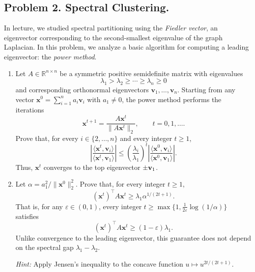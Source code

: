 \documentclass[12pt]{article}
\theoremstyle{plain}
\theoremstyle{definition}
\newcommand{\R}{\mathbb{R}}
\begin{document}
\subsection*{Problem 2. Spectral Clustering.}
In lecture, we studied spectral partitioning using the \emph{Fiedler vector}, an eigenvector corresponding to the second-smallest eigenvalue of the graph Laplacian. In this problem, we analyze a basic algorithm for computing a leading eigenvector: the \emph{power method}.
\begin{enumerate}
    \item Let $A\in\R^{n\times n}$ be a symmetric positive semidefinite matrix with eigenvalues
\[
    \lambda_1>\lambda_2\geq\cdots\geq\lambda_n\geq 0
\]
and corresponding orthonormal eigenvectors $\mathbf{v}_1,\dots,\mathbf{v}_n$. Starting from any vector $\mathbf{x}^0=\sum_{i=1}^n a_i\mathbf{v}_i$ with $a_1\neq 0$, the power method performs the iterations
\[
    \mathbf{x}^{t+1}
    =\frac{A\mathbf{x}^t}{\|A\mathbf{x}^t\|_2},
    \qquad t=0,1,\dots.
\]
Prove that, for every $i\in \{2,\dots,n\}$ and every integer $t\geq 1$,
\[
    \left|
        \frac{\langle\mathbf{x}^t,\mathbf{v}_i\rangle}
             {\langle\mathbf{x}^t,\mathbf{v}_1\rangle}
    \right|
    \leq
    \left(\frac{\lambda_i}{\lambda_1}\right)^t
    \left|
        \frac{\langle\mathbf{x}^0,\mathbf{v}_i\rangle}
             {\langle\mathbf{x}^0,\mathbf{v}_1\rangle}
    \right|.
\]
Thus, $\mathbf{x}^t$ converges to the top eigenvector $\pm{\bf v}_1$.
\item Let $\alpha=a_1^2/\|\mathbf{x}^0\|_2^2$. Prove that, for every integer $t\geq 1$,
\[
    (\mathbf{x}^t)^\top A\mathbf{x}^t
    \geq \lambda_1\alpha^{1/(2t+1)}.
\]
That is, for any $\varepsilon\in(0,1)$, every integer
$t\geq \max\{1,\frac{1}{2\varepsilon}\log(1/\alpha)\}$ satisfies
\[
    (\mathbf{x}^t)^\top A\mathbf{x}^t
    \geq (1-\varepsilon)\lambda_1.
\]
Unlike convergence to the leading eigenvector, this guarantee does not depend on the spectral gap $\lambda_1-\lambda_2$.

\emph{Hint:} Apply Jensen's inequality to the concave function
$u\mapsto u^{2t/(2t+1)}$.  
\end{enumerate}

\newline 
\   %
\newpage
\end{document}
